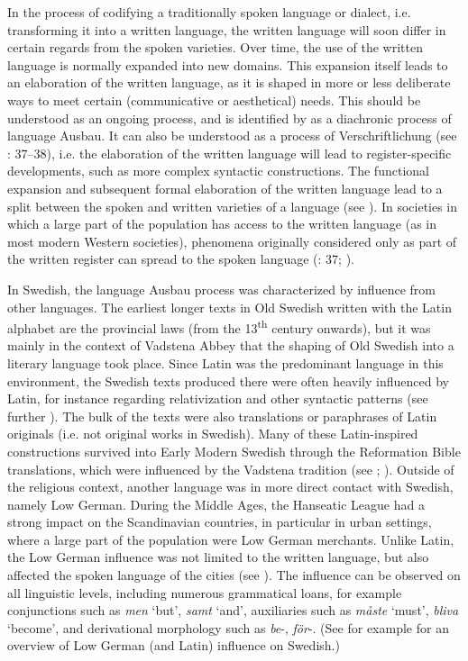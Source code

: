 \documentclass[output=paper]{langscibook}
\begin{document}
In the process of codifying a traditionally spoken language or dialect, i.e. transforming it into a written language, the written language will soon differ in certain regards from the spoken varieties. Over time, the use of the written language is normally expanded into new domains. This expansion itself leads to an elaboration of the written language, as it is shaped in more or less deliberate ways to meet certain (communicative or aesthetical) needs. This should be understood as an ongoing process, and is identified by \citet{Kloss1967} as a diachronic process of language Ausbau. It can also be understood as a process of Verschriftlichung (see \citealt{Fischer2007}: 37–38), i.e. the elaboration of the written language will lead to register-specific developments, such as more complex syntactic constructions. The functional expansion and subsequent formal elaboration of the written language lead to a split between the spoken and written varieties of a language (see \citealt{Hoder2009}). In societies in which a large part of the population has access to the written language (as in most modern Western societies), phenomena originally considered only as part of the written register can spread to the spoken language (\citealt{Fischer2007}: 37; \citealt{Weis2004}). 



In Swedish, the language Ausbau process was characterized by influence from other languages. The earliest longer texts in Old Swedish written with the Latin alphabet are the provincial laws (from the 13\textsuperscript{th} century onwards), but it was mainly in the context of Vadstena Abbey that the shaping of Old Swedish into a literary language took place. Since Latin was the predominant language in this environment, the Swedish texts produced there were often heavily influenced by Latin, for instance regarding relativization and other syntactic patterns (see further \citealt{Hoder2009, Hoder2010, Wollin1981, Wollin1983}). The bulk of the texts were also translations or paraphrases of Latin originals (i.e. not original works in Swedish). Many of these Latin-inspired constructions survived into Early Modern Swedish through the Reformation Bible translations, which were influenced by the Vadstena tradition (see \citealt{Stahle1970}; \citealt{Teleman2002, Teleman2003Swedish}). Outside of the religious context, another language was in more direct contact with Swedish, namely Low German. During the Middle Ages, the Hanseatic League had a strong impact on the Scandinavian countries, in particular in urban settings, where a large part of the population were Low German merchants. Unlike Latin, the Low German influence was not limited to the written language, but also affected the spoken language of the cities (see \citealt{Braunmuller1997,Braunmuller2005,}). The influence can be observed on all linguistic levels, including numerous grammatical loans, for example conjunctions such as \textit{men} ‘but’, \textit{samt} ‘and’, auxiliaries such as \textit{måste} ‘must’, \textit{bliva} ‘become’, and derivational morphology such as \textit{be}{}-, \textit{för}{}-. (See for example \citealt{Braunmuller2005} for an overview of Low German (and Latin) influence on Swedish.)
\end{document}
